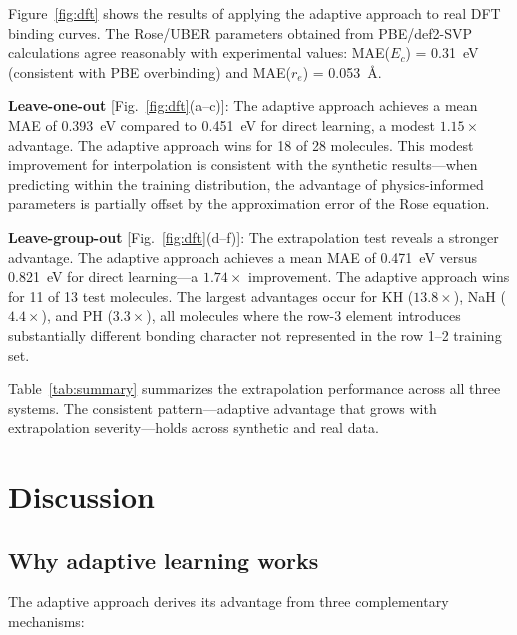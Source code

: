 \documentclass[aps,prb,twocolumn,superscriptaddress,longbibliography,floatfix]{revtex4-2}
\begin{document}
Figure~\ref{fig:dft} shows the results of applying the adaptive approach to real DFT binding curves. The Rose/UBER parameters obtained from PBE/def2-SVP calculations agree reasonably with experimental values: MAE($E_c$) = 0.31~eV (consistent with PBE overbinding) and MAE($r_e$) = 0.053~\AA.

\textbf{Leave-one-out} [Fig.~\ref{fig:dft}(a--c)]: The adaptive approach achieves a mean MAE of 0.393~eV compared to 0.451~eV for direct learning, a modest $1.15\times$ advantage. The adaptive approach wins for 18 of 28 molecules. This modest improvement for interpolation is consistent with the synthetic results---when predicting within the training distribution, the advantage of physics-informed parameters is partially offset by the approximation error of the Rose equation.

\textbf{Leave-group-out} [Fig.~\ref{fig:dft}(d--f)]: The extrapolation test reveals a stronger advantage. The adaptive approach achieves a mean MAE of 0.471~eV versus 0.821~eV for direct learning---a $1.74\times$ improvement. The adaptive approach wins for 11 of 13 test molecules. The largest advantages occur for KH ($13.8\times$), NaH ($4.4\times$), and PH ($3.3\times$), all molecules where the row-3 element introduces substantially different bonding character not represented in the row 1--2 training set.

Table~\ref{tab:summary} summarizes the extrapolation performance across all three systems. The consistent pattern---adaptive advantage that grows with extrapolation severity---holds across synthetic and real data.


\section{Discussion}
\label{sec:discussion}

\subsection{Why adaptive learning works}
\label{sec:why}

The adaptive approach derives its advantage from three complementary mechanisms:
\end{document}
